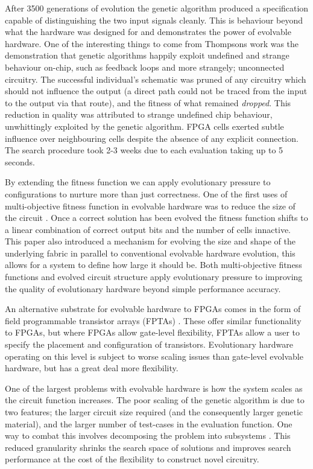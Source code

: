 After 3500 generations of evolution the genetic algorithm produced a specification
capable of distinguishing the two input signals cleanly. This is behaviour beyond
what the hardware was designed for and demonstrates the power of evolvable hardware. One of the
interesting things to come from Thompsons work was the demonstration that genetic
algorithms happily exploit undefined and strange behaviour on-chip, such as feedback
loops and more strangely; unconnected circuitry. The successful
individual's schematic was pruned of any circuitry which should not influence the
output (a direct path could not be traced from the input to the output via that route),
and the fitness of what remained {\em dropped}. This reduction in quality was attributed
to strange undefined chip behaviour, unwhittingly exploited by the genetic algorithm.
FPGA cells exerted subtle influence over neighbouring cells despite the absence of any explicit
connection.
The search procedure took 2-3 weeks
due to each evaluation taking up to 5 seconds.

By extending the fitness function we can apply evolutionary pressure to configurations
to nurture more than just correctness.
One of the first uses of multi-objective fitness function in evolvable hardware was
to reduce the size of the circuit \cite{785435}. Once a correct solution has been evolved the
fitness function shifts to a linear combination of correct output bits and
the number of cells innactive. This paper also introduced a mechanism for evolving the size
and shape of the underlying fabric in parallel to conventional evolvable hardware
evolution, this allows for a system to define
how large it should be.
Both multi-objective fitness functions and evolved circuit structure
apply evolutionary pressure to improving the quality of evolutionary hardware
beyond simple performance accuracy.

An alternative substrate for evolvable hardware to FPGAs comes in the form of field
programmable transistor arrays (FPTAs) \cite{869347}. These offer similar functionality
to FPGAs, but where FPGAs allow gate-level flexibility, FPTAs allow a user to specify
the placement and configuration of transistors. Evolutionary hardware operating on this
level is subject to worse scaling issues than gate-level evolvable hardware, but has a
great deal more flexibility.

One of the largest problems with evolvable hardware is how the system scales as the
circuit function increases. The poor scaling of the genetic algorithm is due to two
features; the larger circuit size required (and the consequently larger genetic material),
and the larger number of test-cases in the evaluation function. One way to combat this
involves decomposing the problem into subsystems \cite{10.1007/978-3-540-46239-2_5}.
This reduced granularity shrinks the search space of solutions and improves search
performance at the cost of the flexibility to construct novel circuitry.


